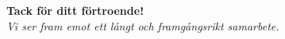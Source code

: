 \documentclass[10pt]{beamer}
\begin{document}
\begin{frame}[fragile]
  \vspace{0.4cm}



  \vspace{0.4cm}
  \begin{center}
    \Large\textbf{Tack för ditt förtroende!}\\
    \vspace{0.2cm}
    \normalsize\textit{Vi ser fram emot ett långt och framgångsrikt samarbete.}
  \end{center}

  \vspace{0.5cm}
  \begin{flushright}
  \end{flushright}

\end{frame}

\end{document}
